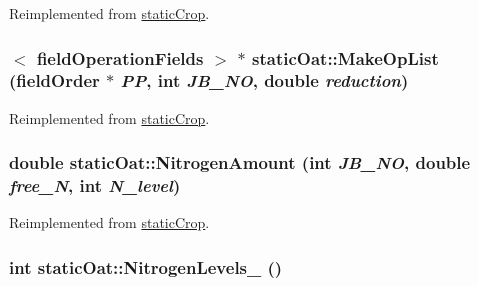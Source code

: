 Reimplemented from \hyperlink{classstatic_crop_a9e8458d1bb0bab4c9a7d05f47fe24537}{staticCrop}.\hypertarget{classstatic_oat_a974ca1626880bafebc0c040c2ac2d84d}{
\subsubsection[{MakeOpList}]{$<$ {\bf fieldOperationFields} $>$ $\ast$ staticOat::MakeOpList ({\bf fieldOrder} $\ast$ {\em PP}, \/  int {\em JB\_\-NO}, \/  double {\em reduction})}}
\label{classstatic_oat_a974ca1626880bafebc0c040c2ac2d84d}


Reimplemented from \hyperlink{classstatic_crop_a9b67ef1ae531a3afb32b63a4aeb5916b}{staticCrop}.\hypertarget{classstatic_oat_a1f0a5175033091c837dea7ccb66dfef9}{
\subsubsection[{NitrogenAmount}]{\setlength{\rightskip}{0pt plus 5cm}double staticOat::NitrogenAmount (int {\em JB\_\-NO}, \/  double {\em free\_\-N}, \/  int {\em N\_\-level})}}
\label{classstatic_oat_a1f0a5175033091c837dea7ccb66dfef9}


Reimplemented from \hyperlink{classstatic_crop_af3aa85321a8a75406f8a0751b71587d0}{staticCrop}.\hypertarget{classstatic_oat_aea9ffb5d23d2bfe402b16172598e359b}{
\subsubsection[{NitrogenLevels\_\-}]{\setlength{\rightskip}{0pt plus 5cm}int staticOat::NitrogenLevels\_\- ()}}
\label{classstatic_oat_aea9ffb5d23d2bfe402b16172598e359b}


